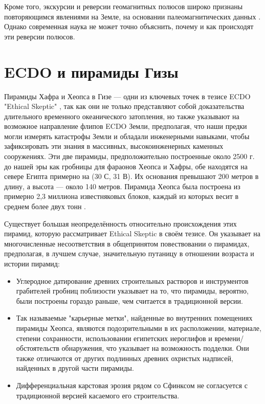 \documentclass[10pt,twocolumn,letterpaper]{article}
\begin{document}
Кроме того, экскурсии и реверсии геомагнитных полюсов широко признаны повторяющимся явлениями на Земле, на основании палеомагнитических данных \cite{35,40,41}. Однако современная наука не может точно объяснить, почему и как происходят эти реверсии полюсов.

\section{ECDO и пирамиды Гизы}

Пирамиды Хафра и Хеопса в Гизе — одни из ключевых точек в тезисе ECDO "Ethical Skeptic" \cite{27}, так как они не только представляют собой доказательства длительного временного океанического затопления, но также указывают на возможное направление флипов ECDO Земли, предполагая, что наши предки могли измерять катастрофы Земли и обладали инженерными навыками, чтобы зафиксировать эти знания в массивных, высокоинженерных каменных сооружениях. Эти две пирамиды, предположительно построенные около 2500 г. до нашей эры как гробницы для фараонов Хеопса и Хафры, обе находятся на севере Египта примерно на (30 С, 31 В). Их основания превышают 200 метров в длину, а высота — около 140 метров. Пирамида Хеопса была построена из примерно 2,3 миллиона известняковых блоков, каждый из которых весит в среднем более двух тонн \cite{24, 25}.

Существует большая неопределённость относительно происхождения этих пирамид, которую рассматривает Ethical Skeptic в своём тезисе. Он указывает на многочисленные несоответствия в общепринятом повествовании о пирамидах, предполагая, в лучшем случае, значительную путаницу в отношении возраста и истории пирамид:

\begin{flushleft}
\begin{itemize}
    \item Углеродное датирование древних строительных растворов и инструментов грабителей гробниц поблизости указывает на то, что пирамиды, вероятно, были построены гораздо раньше, чем считается в традиционной версии.
    \item Так называемые "карьерные метки", найденные во внутренних помещениях пирамиды Хеопса, являются подозрительными в их расположении, материале, степени сохранности, использовании египетских иероглифов и времени/обстоятельств обнаружения, что указывает на возможность подделки. Они также отличаются от других подлинных древних охристых надписей, найденных в другой части пирамиды.
    \item Дифференциальная карстовая эрозия рядом со Сфинксом не согласуется с традиционной версией касаемого его строительства.
\end{itemize}
\end{flushleft}
\end{document}
